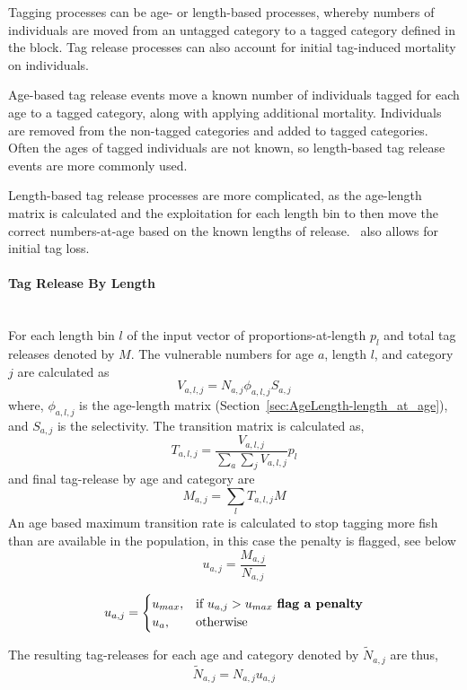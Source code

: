Tagging processes can be age- or length-based processes, whereby numbers of individuals are moved from an untagged category to a tagged category defined in the  block. Tag release processes can also account for initial tag-induced mortality on individuals.

Age-based tag release events move a known number of individuals tagged for each age to a tagged category, along with applying additional mortality. Individuals are removed from the non-tagged categories and added to tagged categories. Often the ages of tagged individuals are not known, so length-based tag release events are more commonly used.

Length-based tag release processes are more complicated, as the age-length matrix is calculated and the exploitation for each length bin to then move the correct numbers-at-age based on the known lengths of release. \CNAME\ also allows for initial tag loss.


\paragraph*{{Tag Release By Length}}
\\

For each length bin $l$ of the input vector of proportions-at-length ${p}_l$ and total tag releases denoted by \(M\). The vulnerable numbers for age \(a\), length \(l\), and category \(j\) are calculated as
$$V_{a,l,j} = N_{a,j} \phi_{a,l,j} S_{a,j}$$
where, \(\phi_{a,l,j}\) is the age-length matrix (Section~\ref{sec:AgeLength-length_at_age}), and \(S_{a,j}\) is the selectivity. The transition matrix is calculated as,
$$ T_{a,l,j}= \frac{V_{a,l,j}}{\sum_a\sum_j V_{a,l,j}} {p}_l$$
and final tag-release by age and category are
$$ M_{a,j} = \sum_l T_{a,l,j}M  $$
An age based maximum transition rate is calculated to stop tagging more fish than are available in the population, in this case the penalty is flagged, see below
$$ u_{a,j} = \frac{ M_{a,j} }{N_{a,j} }  $$

$$
u_{a,j} =
\begin{cases}
u_{max},& \text{if } u_{a,j} > u_{max} \text{ \textbf{flag a penalty}}\\
u_{a},  & \text{otherwise}
\end{cases}
$$

The resulting tag-releases for each age and category denoted by \(\widetilde{N}_{a,j}\) are thus,
$$
\widetilde{N}_{a,j} = N_{a,j} u_{a,j}
$$

